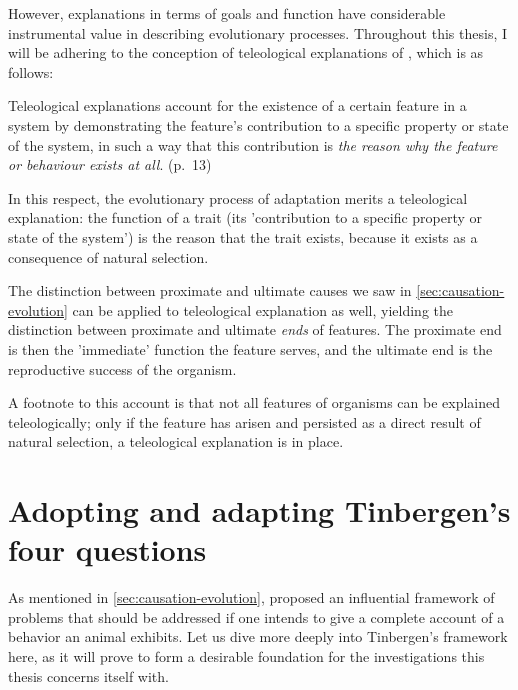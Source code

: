 However, explanations in terms of goals and function have considerable instrumental value in describing evolutionary processes. Throughout this thesis, I will be adhering to the conception of teleological explanations of \citet{Ayala99}, which is as follows:
\begin{quoting}
    Teleological explanations account for the existence of a certain feature in a system by demonstrating the feature’s contribution to a specific property or state of the system, in such a way that this contribution is \emph{the reason why the feature or behaviour exists at all}.
    \hfill (p.~13)
\end{quoting}
In this respect, the evolutionary process of adaptation merits a teleological explanation: the function of a trait (its 'contribution to a specific property or state of the system') is the reason that the trait exists, because it exists as a consequence of natural selection.

The distinction between proximate and ultimate causes we saw in \cref{sec:causation-evolution} can be applied to teleological explanation as well, yielding the distinction between proximate and ultimate \emph{ends} of features. The proximate end is then the 'immediate' function the feature serves, and the ultimate end is the reproductive success of the organism.

A footnote to this account is that not all features of organisms can be explained teleologically; only if the feature has arisen and persisted as a direct result of natural selection, a teleological explanation is in place.
\section{Adopting and adapting Tinbergen's four questions}
\label{sec:tinbergen}
As mentioned in \cref{sec:causation-evolution}, \citet{Tinbergen63} proposed an influential framework of problems that should be addressed if one intends to give a complete account of a behavior an animal exhibits. Let us dive more deeply into Tinbergen's framework here, as it will prove to form a desirable foundation for the investigations this thesis concerns itself with.

